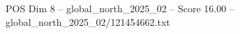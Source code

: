 \begin{textsample}{POS Dim 8 – global\_north\_2025\_02 – Score 16.00 – global\_north\_2025\_02/121454662.txt}
\end{textsample}
